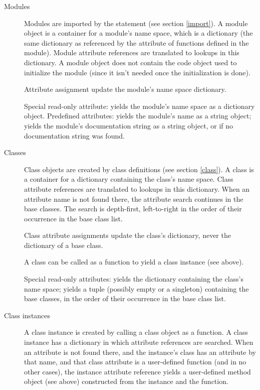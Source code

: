 \begin{description}
\begin{description}
\end{description}

\item[Modules]
Modules are imported by the  statement (see section
\ref{import}).  A module object is a container for a module's name
space, which is a dictionary (the same dictionary as referenced by the
 attribute of functions defined in the module).
Module attribute references are translated to lookups in this
dictionary.  A module object does not contain the code object used to
initialize the module (since it isn't needed once the initialization
is done).

Attribute assignment update the module's name space dictionary.

Special read-only attribute:  yields the module's name
space as a dictionary object.  Predefined attributes: 
yields the module's name as a string object;  yields the
module's documentation string as a string object, or
 if no documentation string was found.

\item[Classes]
Class objects are created by class definitions (see section
\ref{class}).  A class is a container for a dictionary containing the
class's name space.  Class attribute references are translated to
lookups in this dictionary.  When an attribute name is not found
there, the attribute search continues in the base classes.  The search
is depth-first, left-to-right in the order of their occurrence in the
base class list.

Class attribute assignments update the class's dictionary, never the
dictionary of a base class.

A class can be called as a function to yield a class instance (see
above).

Special read-only attributes:  yields the dictionary
containing the class's name space;  yields a tuple
(possibly empty or a singleton) containing the base classes, in the
order of their occurrence in the base class list.

\item[Class instances]
A class instance is created by calling a class object as a
function.  A class instance has a dictionary in which
attribute references are searched.  When an attribute is not found
there, and the instance's class has an attribute by that name, and
that class attribute is a user-defined function (and in no other
cases), the instance attribute reference yields a user-defined method
object (see above) constructed from the instance and the function.


\end{description}
